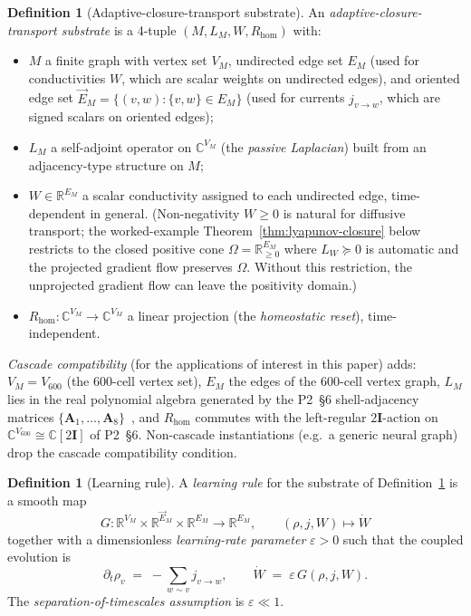 \documentclass[11pt]{article}
\theoremstyle{definition}
\newtheorem{definition}[theorem]{Definition}
\newcommand{\R}{\mathbb{R}}
\newcommand{\C}{\mathbb{C}}
\newcommand{\twoI}{2\mathbf{I}}
\begin{document}
\begin{definition}[Adaptive-closure-transport substrate]\label{def:4tuple}
An \emph{adaptive-closure-transport substrate} is a 4-tuple $(M, L_M, W, R_{\mathrm{hom}})$ with:
\begin{itemize}
    \item $M$ a finite graph with vertex set $V_M$, undirected edge set $E_M$ (used for conductivities $W$, which are scalar weights on undirected edges), and oriented edge set $\vec E_M = \{(v,w) : \{v,w\} \in E_M\}$ (used for currents $j_{v\to w}$, which are signed scalars on oriented edges);
    \item $L_M$ a self-adjoint operator on $\C^{V_M}$ (the \emph{passive Laplacian}) built from an adjacency-type structure on $M$;
    \item $W \in \R^{E_M}$ a scalar conductivity assigned to each undirected edge, time-dependent in general. (Non-negativity $W \geq 0$ is natural for diffusive transport; the worked-example Theorem~\ref{thm:lyapunov-closure} below restricts to the closed positive cone $\Omega = \R^{E_M}_{\geq 0}$ where $L_W \succeq 0$ is automatic and the projected gradient flow preserves $\Omega$. Without this restriction, the unprojected gradient flow can leave the positivity domain.)
    \item $R_{\mathrm{hom}}: \C^{V_M} \to \C^{V_M}$ a linear projection (the \emph{homeostatic reset}), time-independent.
\end{itemize}
\emph{Cascade compatibility} (for the applications of interest in this paper) adds: $V_M = V_{600}$ (the $600$-cell vertex set), $E_M$ the edges of the $600$-cell vertex graph, $L_M$ lies in the real polynomial algebra generated by the P2~\S 6 shell-adjacency matrices $\{\mathbf{A}_1, \ldots, \mathbf{A}_8\}$~\citep{CascadeAlgSubstrate}, and $R_{\mathrm{hom}}$ commutes with the left-regular $\twoI$-action on $\C^{V_{600}} \cong \C[\twoI]$ of P2~\S 6. Non-cascade instantiations (e.g.\ a generic neural graph) drop the cascade compatibility condition.
\end{definition}

\begin{definition}[Learning rule]\label{def:learning}
A \emph{learning rule} for the substrate of Definition~\ref{def:4tuple} is a smooth map
\[
    G: \R^{V_M} \times \R^{\vec E_M} \times \R^{E_M} \to \R^{E_M},
    \qquad (\rho, j, W) \mapsto \dot W
\]
together with a dimensionless \emph{learning-rate parameter} $\varepsilon > 0$ such that the coupled evolution is
\begin{equation}\label{eq:coupled}
    \partial_t \rho_v \;=\; -\sum_{w \sim v} j_{v \to w}, \qquad
    \dot W \;=\; \varepsilon\, G(\rho, j, W).
\end{equation}
The \emph{separation-of-timescales assumption} is $\varepsilon \ll 1$.
\end{definition}
\end{document}
